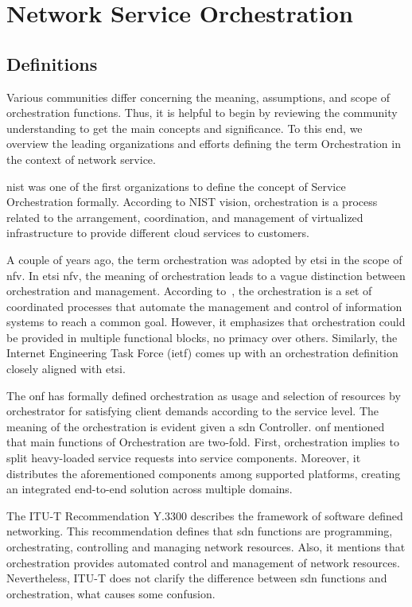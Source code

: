 \section{Network Service Orchestration}
\label{sec:nso}

\subsection{Definitions}
\label{sec:orchdef}

Various communities differ concerning the meaning, assumptions, and scope of orchestration functions. Thus, it is helpful to begin by reviewing the community understanding to get the main concepts and significance. To this end, we overview the leading organizations and efforts defining the term Orchestration in the context of network service.

\gls{nist} \cite{Bohn2011NISTArchitecture} was one of the first organizations to define the concept of Service Orchestration formally. According to NIST vision, orchestration is a process related to the arrangement, coordination, and management of virtualized infrastructure to provide different cloud services to customers.

A couple of years ago, the term orchestration was adopted by \gls{etsi} in the scope of \gls{nfv}. In \gls{etsi} \gls{nfv}, the meaning of orchestration leads to a vague distinction between orchestration and management. According to~\cite{ETSIISG2018}, the orchestration is a set of coordinated processes that automate the management and control of information systems to reach a common goal. However, it emphasizes that orchestration could be provided in multiple functional blocks, no primacy over others. Similarly, the Internet Engineering Task Force (\gls{ietf}) comes up with an orchestration definition closely aligned with \gls{etsi}. 

The \gls{onf} \cite{OpenNetworkingFoundation2016FrameworkNetworks} has formally defined orchestration as usage and selection of resources by orchestrator for satisfying client demands according to the service level. The meaning of the orchestration is evident given a \gls{sdn} Controller. \gls{onf} mentioned that main functions of Orchestration are two-fold. First, orchestration implies to split heavy-loaded service requests into service components. Moreover, it distributes the aforementioned components among supported platforms, creating an integrated end-to-end solution across multiple domains.

The ITU-T Recommendation Y.3300 \cite{InternationalTelecommunicationUnion2014ITU-TNetworking} describes the framework of software defined networking. This recommendation defines that \gls{sdn} functions are programming, orchestrating, controlling and managing network resources. Also, it mentions that orchestration provides automated control and management of network resources. Nevertheless, ITU-T does not clarify the difference between \gls{sdn} functions and orchestration, what causes some confusion.

